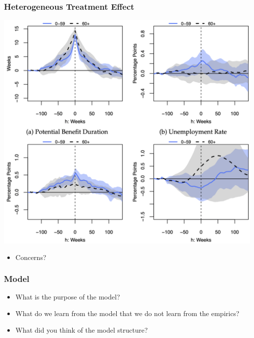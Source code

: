 \documentclass[english,xcolor=svgnames]{beamer}
\begin{document}
\begin{frame}
	\frametitle[alignment=center]{Heterogeneous Treatment Effect}
	\begin{center}
		\includegraphics[scale=0.3]{figures/AMNSFIG7.png}
	\end{center}
	\begin{itemize}
		\item Concerns?
	\end{itemize}
\end{frame}


\begin{frame}
	\frametitle[alignment=center]{Model}
	\begin{itemize}
		\item What is the purpose of the model?
		\item What do we learn from the model that we do not learn from the empirics?
		\item What did you think of the model structure?
	\end{itemize}
\end{frame}
\end{document}
